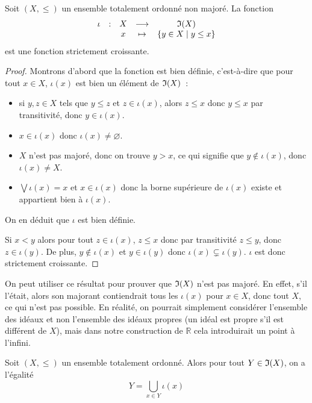 \begin{proposition}
  Soit $(X,\leq)$ un ensemble totalement ordonné non majoré. La fonction
  \[\begin{array}{ccccc}
  \iota & : & X & \longrightarrow & \mathfrak{I}(X)\\
  & & x &\mapsto & \{y \in X \mid y \leq x\}
  \end{array}\]
  est une fonction strictement croissante.
\end{proposition}

\begin{proof}
  Montrons d'abord que la fonction est bien définie, c'est-à-dire que pour tout
  $x\in X$, $\iota(x)$ est bien un élément de $\mathfrak{I}(X)$~:
  \begin{itemize}
  \item si $y,z\in X$ tels que $y\leq z$ et $z\in \iota(x)$, alors $z \leq x$
    donc $y\leq x$ par transitivité, donc $y\in \iota(x)$.
  \item $x\in\iota(x)$ donc $\iota(x)\neq\varnothing$.
  \item $X$ n'est pas majoré, donc on trouve $y > x$, ce qui signifie que
    $y\notin\iota(x)$, donc $\iota(x)\neq X$.
  \item $\bigvee\iota(x) = x$ et $x\in\iota(x)$ donc la borne supérieure  de
    $\iota(x)$ existe et appartient bien à $\iota(x)$.
  \end{itemize}
  On en déduit que $\iota$ est bien définie.

  Si $x < y$ alors pour tout $z \in \iota(x)$, $z \leq x$ donc par transitivité
  $z \leq y$, donc $z \in \iota(y)$. De plus, $y\notin\iota(x)$ et
  $y\in\iota(y)$ donc $\iota(x)\subsetneq\iota(y)$. $\iota$ est donc strictement
  croissante.
\end{proof}

\begin{remark}
  On peut utiliser ce résultat pour prouver que $\mathfrak{I}(X)$ n'est pas majoré.
  En effet, s'il l'était, alors son majorant contiendrait tous les $\iota(x)$
  pour $x\in X$, donc tout $X$, ce qui n'est pas possible. En réalité, on
  pourrait simplement considérer l'ensemble des idéaux et non l'ensemble des
  idéaux propres (un idéal est propre s'il est différent de $X$), mais dans
  notre construction de $\mathbb R$ cela introduirait un point à l'infini.
\end{remark}

\begin{lemma}\label{lem.id.cup}
  Soit $(X,\leq)$ un ensemble totalement ordonné. Alors pour tout
  $Y\in\mathfrak{I}(X)$, on a l'égalité
  \[Y = \bigcup_{x\in Y} \iota(x)\]
\end{lemma}

